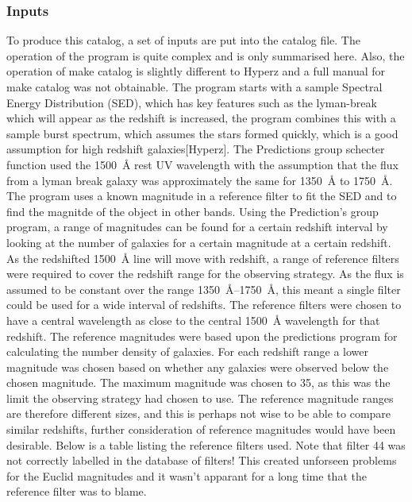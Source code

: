         \subsubsection{Inputs} %
        \label{subsub:Hyperz_inputs}
			To produce this catalog, a set of inputs are put into the catalog file. The operation of the program is quite complex and is only summarised here. Also, the operation of make catalog is slightly different to Hyperz and a full manual for make catalog was not obtainable. The program starts with a sample Spectral Energy Distribution (SED), which has key features such as the lyman-break which will appear as the redshift is increased, the program combines this with a sample burst spectrum, which assumes the stars formed quickly, which is a good assumption for high redshift galaxies[Hyperz]. The Predictions group schecter function used the \SI{1500}{\angstrom} rest UV wavelength with the assumption that the flux from a lyman break galaxy was approximately the same for \SI{1350}{\angstrom} to \SI{1750}{\angstrom}. The program uses a known magnitude in a reference filter to fit the SED and to find the magnitde of the object in other bands. Using the Prediction's group program, a range of magnitudes can be found for a certain redshift interval by looking at the number of galaxies for a certain magnitude at a certain redshift. As the redshifted \SI{1500}{\angstrom} line will move with redshift, a range of reference filters were required to cover the redshift range for the observing strategy. As the flux is assumed to be constant over the range \SI{1350}{\angstrom}--\SI{1750}{\angstrom}, this meant a single filter could be used for a wide interval of redshifts. The reference filters were chosen to have a central wavelength as close to the central \SI{1500}{\angstrom} wavelength for that redshift. The reference magnitudes were based upon the predictions program for calculating the number density of galaxies. For each redshift range a lower magnitude was chosen based on whether any galaxies were observed below the chosen magnitude. The maximum magnitude was chosen to 35, as this was the limit the observing strategy had chosen to use. The reference magnitude ranges are therefore different sizes, and this is perhaps not wise to be able to compare similar redshifts, further consideration of reference magnitudes would have been desirable. Below is a table listing the reference filters used. Note that filter 44 was not correctly labelled in the database of filters! This created unforseen problems for the Euclid magnitudes and it wasn't apparant for a long time that the reference filter was to blame. 

